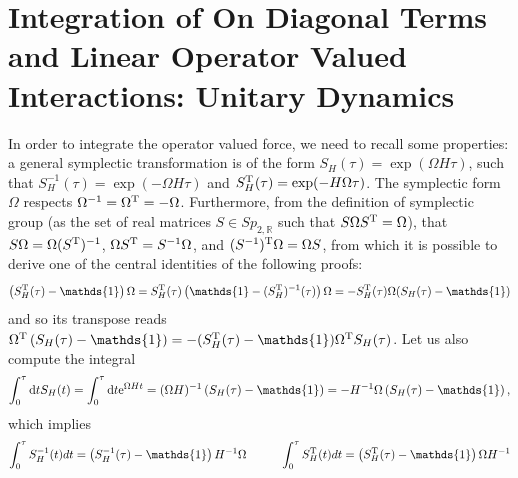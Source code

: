 \documentclass[%
reprint,
superscriptaddress,
nofootinbib,
 amsmath,amssymb,
prx,
floatfix,
]{revtex4-2}
\begin{document}



\section{Integration of On Diagonal Terms and Linear Operator Valued Interactions: Unitary Dynamics \label{app:only_force}}

In order to integrate the operator valued force, we need to recall some properties: a general symplectic transformation is of the form $S_H(\tau) = \exp( \Omega H \tau)$, such that  $S_H^{-1} (\tau) = \exp (- \Omega H \tau) $ and $S_H^{\rm T} (\tau) = \exp (- H \Omega \tau) $. The symplectic form $\Omega$ respects $\Omega^{-1} = \Omega^{\rm T} = - \Omega$. Furthermore, from the definition of symplectic group (as the set of real matrices $S \in Sp_{2, \mathds{R}}$ such that $S \Omega S^{\rm T} = \Omega$), that $S \Omega  = \Omega (S^{\rm T})^{-1}$, $ \Omega S^{\rm T}  = S^{-1}  \Omega$, and $(S^{-1})^{\rm T}  \Omega = \Omega S $, from which it is possible to derive one of the central identities of the following proofs:
\begin{equation}
\label{eq:identity_usefull}
    \left( S^{\rm T}_H(\tau) - \mathds{1} \right)\Omega =  S^{\rm T}_H(\tau) \left( \mathds{1} - (S^{\rm T}_H)^{-1}(\tau)\right)\Omega = - S^{\rm T}_H(\tau) \Omega (S_H(\tau) - \mathds{1})
\end{equation}
and so its transpose reads $\Omega^{\rm T} \left( S_H(\tau) - \mathds{1} \right) =- (S_H^{\rm T}(\tau) - \mathds{1})\Omega^{\rm T} S_H(\tau) $. Let us also compute the integral
\begin{equation}
    \int_0^\tau \text{d}t S_H(t)  =\int_0^\tau \text{d}t {\rm e}^{ \Omega H t}  =  ( \Omega H)^{-1} \left(S_H(\tau) - \mathds{1} \right) = - H^{-1} \Omega  \left(S_H(\tau) - \mathds{1} \right),
\end{equation}
which implies  
\begin{equation}
    \int_0^\tau S_H^{-1}(t) dt =   \left(S_H^{-1}(\tau) - \mathds{1} \right) H^{-1} \Omega \hspace{1cm} \int_0^\tau S_H^{\rm T}(t) dt =     \left(S_H^{\rm T}(\tau) - \mathds{1} \right) \Omega  H^{-1}
\end{equation}
\end{document}
